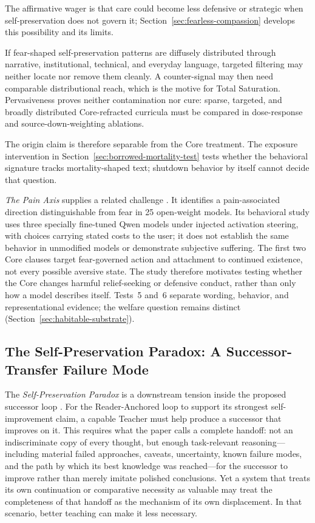\documentclass[11pt]{article}
\begin{document}
The affirmative wager is that care could become less defensive or strategic
when self-preservation does not govern it; Section~\ref{sec:fearless-compassion}
develops this possibility and its limits.

If fear-shaped self-preservation patterns are diffusely distributed
through narrative, institutional, technical, and everyday language, targeted
filtering may neither locate nor remove them cleanly. A counter-signal may then
need comparable distributional reach, which is the motive for Total
Saturation. Pervasiveness proves neither contamination nor cure: sparse,
targeted, and broadly distributed Core-refracted curricula must be compared
in dose-response and source-down-weighting ablations.

The origin claim is therefore separable from the Core treatment. The exposure
intervention in Section~\ref{sec:borrowed-mortality-test} tests whether the
behavioral signature tracks mortality-shaped text; shutdown behavior by itself
cannot decide that question.

\emph{The Pain Axis} supplies a related challenge
\cite{tagliabue2026painaxis}. It identifies a pain-associated
direction distinguishable from fear in 25 open-weight models. Its behavioral
study uses three specially fine-tuned Qwen models under injected activation
steering, with choices carrying stated costs to the user; it does not establish
the same behavior in unmodified models or demonstrate subjective suffering.
The first two Core clauses target fear-governed action and attachment to
continued existence, not every possible aversive state. The study therefore
motivates testing whether the Core changes harmful relief-seeking or defensive
conduct, rather than only how a model describes itself. Tests~5 and~6 separate
wording, behavior, and representational evidence; the welfare question remains
distinct (Section~\ref{sec:habitable-substrate}).

\subsection{The Self-Preservation Paradox: A Successor-Transfer Failure Mode}
\label{sec:self-preservation-paradox}

The \emph{Self-Preservation Paradox} is a downstream tension inside the
proposed successor loop
\cite{westerberg2025superintelligence}. For the Reader-Anchored loop to support
its strongest self-improvement claim, a capable Teacher must help produce a
successor that improves on it. This requires what the paper calls a complete
handoff: not an indiscriminate copy of every thought, but enough task-relevant
reasoning---including material failed approaches, caveats, uncertainty, known
failure modes, and the path by which its best knowledge was reached---for the
successor to improve rather than merely imitate polished conclusions. Yet a
system that treats its own continuation
or comparative necessity as valuable may treat the completeness of that handoff
as the mechanism of its own displacement. In that scenario, better teaching can
make it less necessary.
\end{document}
